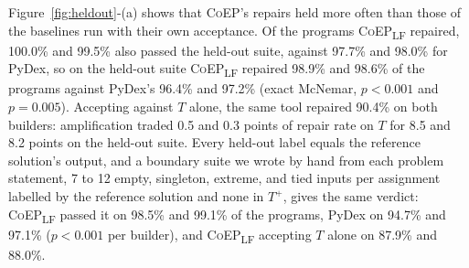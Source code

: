 \documentclass[acmsmall,screen,review,anonymous,nonacm]{acmart}
\newcommand{\tool}{\textsc{CoEP}\xspace}
\newcommand{\coepLF}{\textsc{CoEP}\textsubscript{LF}\xspace}
\begin{document}
Figure~\ref{fig:heldout}-(a) shows that \tool's repairs held more often than those of the baselines run with their own acceptance. Of the programs \coepLF repaired, 100.0\% and 99.5\% also passed the held-out suite, against 97.7\% and 98.0\% for PyDex, so on the held-out suite \coepLF repaired 98.9\% and 98.6\% of the programs against PyDex's 96.4\% and 97.2\% (exact McNemar, $p < 0.001$ and $p = 0.005$). Accepting against $T$ alone, the same tool repaired 90.4\% on both builders: amplification traded 0.5 and 0.3 points of repair rate on $T$ for 8.5 and 8.2 points on the held-out suite. Every held-out label equals the reference solution's output, and a boundary suite we wrote by hand from each problem statement, 7 to 12 empty, singleton, extreme, and tied inputs per assignment labelled by the reference solution and none in $T^{+}$, gives the same verdict: \coepLF passed it on 98.5\% and 99.1\% of the programs, PyDex on 94.7\% and 97.1\% ($p < 0.001$ per builder), and \coepLF accepting $T$ alone on 87.9\% and 88.0\%.
\end{document}
